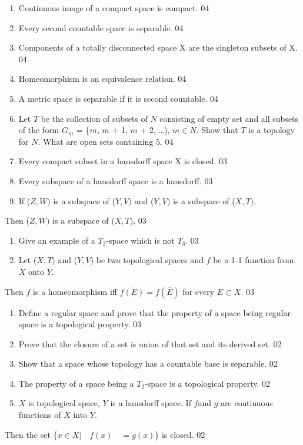 \documentclass[12pt]{amsart}
\begin{document}
\begin{enumerate}
\item Continuous image of a compact space is compact. 04
\item Every second countable space is separable. 04
\item Components of a totally disconnected space X are the singleton subsets of X. 04
\item Homeomorphism is an equivalence relation. 04
\item A metric space is separable if it is second countable. 04
\item Let $T$ be the collection of subsets of $N$ consisting of empty set and all subsets of the form $G_{m}$ = {\{}$m$, $m$ + 1, $m$ + 2, {\ldots}), $m\in N$. Show that $T$ is a topology for $N$. What are open sets containing 5. 04
\item Every compact subset in a hausdorff space X is closed. 03
\item Every subspace of a hausdorff space is a hausdorff. 03
\item If ($Z, W)$ is a subspace of ($Y, V)$ and ($Y, V)$ is a subspace of ($X, T)$. 
\end{enumerate}
Then ($Z, W)$ is a subspace of ($X, T)$. 03

\begin{enumerate}
\item Give an example of a $T_{2}$-space which is not $T_{3}$. 03
\item Let ($X, T )$ and ($Y, V)$ be two topological spaces and $f$ be a 1-1 function from $X$ onto $Y$. 
\end{enumerate}
Then $f$ is a homeomorphism iff $\overline {f(E)} =f(\overline E )$ for 
every $E \subset X$. 03

\begin{enumerate}
\item Define a regular space and prove that the property of a space being regular space is a topological property. 03
\item Prove that the closure of a set is union of that set and its derived set. 02
\item Show that a space whose topology has a countable base is separable. 02
\item The property of a space being a $T_{2}$-space is a topological property. 02
\item $X$ is topological space, $Y$ is a hausdorff space. If $f $and $g$ are continuous functions of $X$ into $Y$. 
\end{enumerate}
Then the set {\{}$x \in X\vert  \quad f(x) \quad = g(x)${\}} is closed. 02
\end{document}
